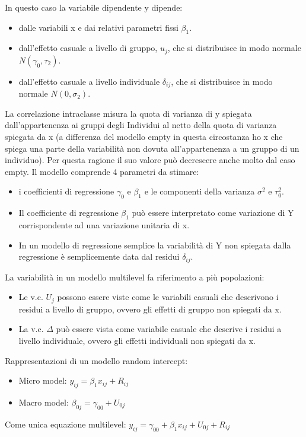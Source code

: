 \documentclass[a4page, 11pt]{article} %
\begin{document}
In questo caso la variabile dipendente y dipende:
\begin{itemize}
\item dalle variabili x e dai relativi parametri fissi $\beta_1$.
\item dall’effetto casuale a livello di gruppo, $u_j$, che si distribuisce in modo normale  $N(\gamma_0, \tau_2)$.
\item dall’effetto casuale a livello individuale $\delta_{ij}$, che si distribuisce in modo normale $N(0,\sigma_2)$.
\end{itemize}
La correlazione intraclasse misura la quota di varianza di y spiegata dall’appartenenza ai gruppi degli Individui al netto della quota di varianza spiegata da x (a differenza del modello empty in questa circostanza ho x che spiega una parte della variabilità non dovuta all’appartenenza a un gruppo di un individuo). Per questa ragione il suo valore può decrescere anche molto dal caso empty. Il modello comprende 4 parametri da stimare:
\begin{itemize}
\item i coefficienti di regressione $\gamma_0$ e $\beta_1$ e le componenti della varianza $\sigma^{2}$ e $\tau^{2}_0$.
\item Il coefficiente di regressione $\beta_1$ può essere interpretato come variazione di Y corrispondente ad una variazione unitaria di x.
\item In un modello di regressione semplice la variabilità di Y non spiegata dalla regressione è semplicemente data dal residui $\delta_{ij}$.
\end{itemize}
La variabilità in un modello multilevel fa riferimento a più popolazioni:
\begin{itemize}
\item Le v.c. $U_j$ possono essere viste come le variabili casuali che descrivono i residui a livello di gruppo, ovvero gli effetti di gruppo non spiegati da x.
\item La v.c. $\Delta$ può essere vista come variabile casuale che descrive i residui a livello individuale, ovvero gli effetti individuali non spiegati da x.
\end{itemize}
Rappresentazioni di un modello random intercept:
\begin{itemize}
\item Micro model: $y_{ij}=\beta_1 x_{ij}+R_{ij}$
\item Macro model: $\beta_{0j}=\gamma_{00}+U_{0j}$
\end{itemize}
Come unica equazione multilevel: $y_{ij}=\gamma_{00}+\beta_1 x_{ij}+ U_{0j}+R_{ij}$
\end{document}
